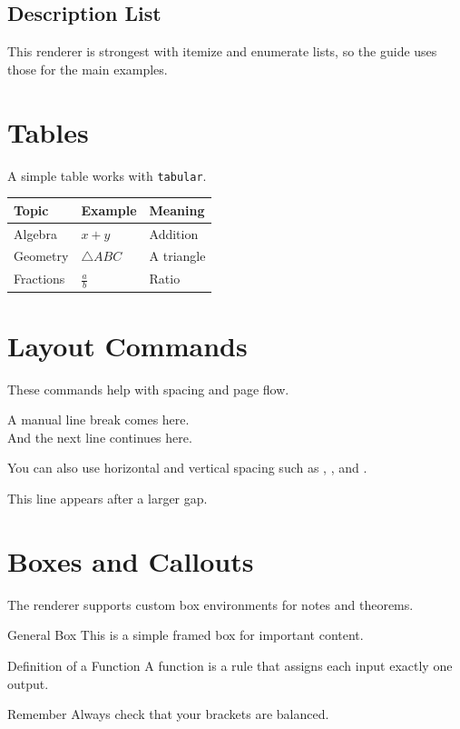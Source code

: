 \documentclass{article}
\begin{document}
\subsection{Description List}
This renderer is strongest with itemize and enumerate lists, so the guide uses those for the main examples.

\section{Tables}
A simple table works with \texttt{tabular}.

\begin{tabular}{lll}
Topic & Example & Meaning \\
\hline
Algebra & $x+y$ & Addition \\
Geometry & $\triangle ABC$ & A triangle \\
Fractions & $\frac{a}{b}$ & Ratio \\
\end{tabular}

\section{Layout Commands}
These commands help with spacing and page flow.

A manual line break comes here.\\
And the next line continues here.

You can also use horizontal and vertical spacing such as \texttt{\string\bigskip}, \texttt{\string\medskip}, and \texttt{\string\smallskip}.

\bigskip
This line appears after a larger gap.

\section{Boxes and Callouts}
The renderer supports custom box environments for notes and theorems.

\begin{box}{General Box}
This is a simple framed box for important content.
\end{box}

\begin{boxdef}{Definition of a Function}
A function is a rule that assigns each input exactly one output.
\end{boxdef}

\begin{boxnote}{Remember}
Always check that your brackets are balanced.
\end{boxnote}
\end{document}
